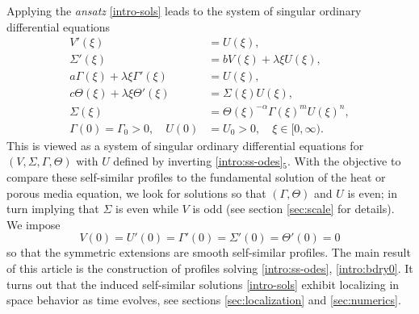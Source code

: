 \documentclass[11pt]{article}
\theoremstyle{remark}
\begin{document}
Applying the {\it ansatz} \eqref{intro-sols} leads
to the system of  singular ordinary differential equations
\begin{equation} \label{intro:ss-odes}
\begin{aligned}
 V'(\xi)&=U(\xi),\\
 \Sigma' (\xi) &=  b V(\xi) + \lambda \xi U(\xi) , \\
 a \Gamma(\xi) + \lambda \xi \Gamma'(\xi) &= U(\xi), \\
 c \Theta(\xi) + \lambda \xi \Theta'(\xi)&=\Sigma(\xi) U(\xi),\\
 \Sigma(\xi) &= \Theta(\xi)^{-\alpha} \Gamma(\xi)^m U(\xi)^n, \\
 \Gamma(0)=\Gamma_0>0, \quad U(0)&=U_0>0, \quad \text{$\xi \in [0,\infty)$}.
\end{aligned}
\end{equation}
This is viewed as a system of singular ordinary differential equations for $(V, \Sigma, \Gamma, \Theta)$ with $U$
defined by inverting \eqref{intro:ss-odes}$_5$.
With the objective to compare these self-similar profiles to the fundamental solution of the heat or porous media equation,
we look for solutions so that $(\Gamma,\Theta)$  and $U$ is even; in turn implying that
$\Sigma$  is even while $V$ is odd (see section \ref{sec:scale} for details).
We impose
\begin{equation}
 V(0)=U'(0)=\Gamma'(0)=\Sigma'(0)=\Theta'(0)=0  \label{intro:bdry0}
\end{equation}
so that the symmetric extensions are smooth self-similar profiles.
The main result of this article is the construction of profiles solving \eqref{intro:ss-odes}, \eqref{intro:bdry0}.
It turns out that the induced self-similar solutions \eqref{intro-sols}
exhibit localizing in space behavior as time evolves, see sections \ref{sec:localization}
and \ref{sec:numerics}.
\end{document}
